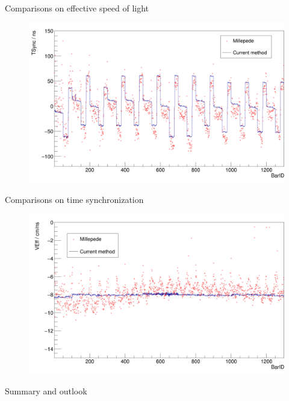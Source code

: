 \documentclass[compress, 13pt, aspectratio=169]{beamer}
\begin{document}
\begin{frame}[t]{Comparisons on effective speed of light}
	\begin{figure}[t]
		\vspace*{-1em}
		\centering
		\includegraphics[height = 0.9 \textheight]{tsync.png}
	\end{figure}
\end{frame}

\begin{frame}[t]{Comparisons on time synchronization}
	\begin{figure}[t]
		\vspace*{-1em}
		\centering
		\includegraphics[height = 0.9 \textheight]{effective_c.png}
	\end{figure}
\end{frame}

\begin{frame}[t]{Summary and outlook}

\end{frame}
\end{document}
